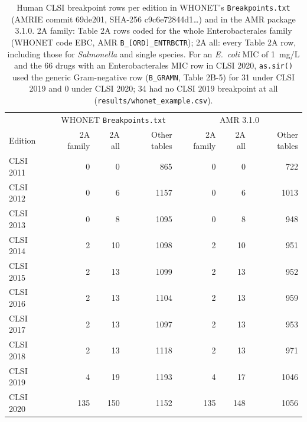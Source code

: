\begin{table}[h]
\centering
\scriptsize
\begin{tabular}{lrrrrrr}
\toprule
 & \multicolumn{3}{c}{WHONET \texttt{Breakpoints.txt}} & \multicolumn{3}{c}{AMR 3.1.0} \\
Edition & 2A family & 2A all & Other tables & 2A family & 2A all & Other tables \\
\midrule
CLSI 2011 & 0 & 0 & 865 & 0 & 0 & 722 \\
CLSI 2012 & 0 & 6 & 1157 & 0 & 6 & 1013 \\
CLSI 2013 & 0 & 8 & 1095 & 0 & 8 & 948 \\
CLSI 2014 & 2 & 10 & 1098 & 2 & 10 & 951 \\
CLSI 2015 & 2 & 13 & 1099 & 2 & 13 & 952 \\
CLSI 2016 & 2 & 13 & 1104 & 2 & 13 & 959 \\
CLSI 2017 & 2 & 13 & 1097 & 2 & 13 & 953 \\
CLSI 2018 & 2 & 13 & 1118 & 2 & 13 & 971 \\
CLSI 2019 & 4 & 19 & 1193 & 4 & 17 & 1046 \\
CLSI 2020 & 135 & 150 & 1152 & 135 & 148 & 1056 \\
\bottomrule
\end{tabular}
\caption{Human CLSI breakpoint rows per edition in WHONET's \texttt{Breakpoints.txt} (AMRIE commit 69de201, SHA-256 c9c6e72844d1\ldots) and in the AMR package 3.1.0. 2A family: Table 2A rows coded for the whole Enterobacterales family (WHONET code EBC, AMR \texttt{B\_[ORD]\_ENTRBCTR}); 2A all: every Table 2A row, including those for \textit{Salmonella} and single species. For an \textit{E.~coli} MIC of 1~mg/L and the 66 drugs with an Enterobacterales MIC row in CLSI 2020, \texttt{as.sir()} used the generic Gram-negative row (\texttt{B\_GRAMN}, Table 2B-5) for 31 under CLSI 2019 and 0 under CLSI 2020; 34 had no CLSI 2019 breakpoint at all (\texttt{results/whonet\_example.csv}).}
\end{table}

